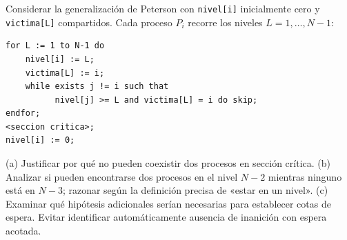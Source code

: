 \documentclass[11pt,a4paper,oneside]{report}
\begin{document}
\begin{ejercicio}
Considerar la generalización de Peterson con \texttt{nivel[i]} inicialmente cero y \texttt{victima[L]}
compartidos. Cada proceso $P_i$ recorre los niveles $L = 1, \dots, N-1$:
\begin{lstlisting}
for L := 1 to N-1 do
    nivel[i] := L;
    victima[L] := i;
    while exists j != i such that
          nivel[j] >= L and victima[L] = i do skip;
endfor;
<seccion critica>;
nivel[i] := 0;
\end{lstlisting}
(a) Justificar por qué no pueden coexistir dos procesos en sección crítica. (b) Analizar si pueden encontrarse dos
procesos en el nivel $N-2$ mientras ninguno está en $N-3$; razonar según la definición precisa de «estar en un
nivel». (c) Examinar qué hipótesis adicionales serían necesarias para establecer cotas de espera. Evitar
identificar automáticamente ausencia de inanición con espera acotada.
\end{ejercicio}
\end{document}
